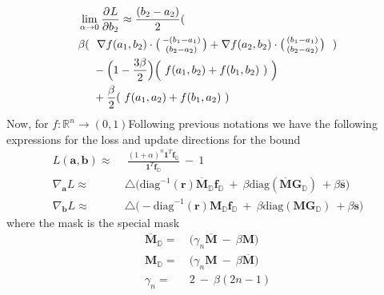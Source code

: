 \begin{equation}
\begin{aligned} 
& \lim_{\alpha \to 0} \frac{\partial^{} L}{\partial b_{2}} \approx \frac{(b_{2}-a_{2})}{2}( \\
&\beta(~~\nabla f(a_1,b_2)\cdot \bigl( \begin{smallmatrix} -(b_1 -a_1)\\ (b_2 -a_2) \end{smallmatrix} \bigr) + \nabla f(a_2,b_2)\cdot \bigl( \begin{smallmatrix} (b_1 -a_1)\\ (b_2 -a_2) \end{smallmatrix} \bigr)~~)\\ &~~~~-\Big(1-\frac{3\beta}{2}\Big)               \Big(~f(a_{1},b_{2}) + f(b_{1},b_{2})~)~\Big) \\ &~~~~+ \frac \beta2 (~f(a_{1},a_{2}) + f(b_{1},a_{2})~)
\label{eq:update-outer-2-4-w}
\end{aligned}
\end{equation}
Now, for $f: \mathbb{R}^{n} \rightarrow (0,1)$Following previous notations we have the following expressions for the loss and update directions for the bound 
\begin{equation}
\begin{aligned} 
L(\mathbf{a},\mathbf{b})  \approx&~~ \frac{(1+\alpha)^{n} \mathbf{1}^{T}\mathbf{f}_{\mathbb{Q}}}{\mathbf{1}^{T}\mathbf{f}_{\mathbb{D}}} ~-~ 1\\ 
\nabla_{\mathbf{a}}L  \approx & ~\triangle  \Big(\text{diag}^{-1}(\mathbf{r})\overline{\mathbf{M}}_{\mathbb{D}}\mathbf{f}_{\mathbb{D}} ~+~ \beta\text{diag}(\overline{\mathbf{M}}\mathbf{G}_{\mathbb{D}})~+ \beta \overline{\mathbf{s}}  \Big)  \\
\nabla_{\mathbf{b}}L  \approx & ~\triangle  \Big(- \text{diag}^{-1}(\mathbf{r})\mathbf{M}_{\mathbb{D}}\mathbf{f}_{\mathbb{D}} ~+~ \beta\text{diag}(\mathbf{M}\mathbf{G}_{\mathbb{D}})~+ \beta \mathbf{s}  \Big)
\label{eq:n-loss-update-grad-sup}
\end{aligned}
\end{equation}
where the mask is the special mask 
\begin{equation}
\begin{aligned} 
 \overline{\mathbf{M}}_{\mathbb{D}} =&~ \Big( \gamma_n \overline{\mathbf{M}} ~-~\beta \mathbf{M}  \Big) \\
  \mathbf{M}_{\mathbb{D}} =&~ \Big( \gamma_n \mathbf{M} ~-~\beta \overline{\mathbf{M}}  \Big) \\
  \gamma_n =&~ 2~-~\beta(2n-1) 
\label{eq:n-mask-grad-sup}
\end{aligned}
\end{equation}
